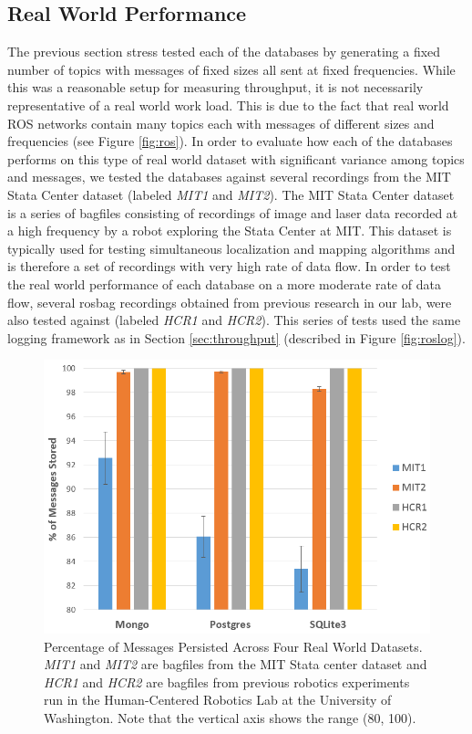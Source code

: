 \documentclass[nocopyrightspace]{acm_proc_article-sp}
\begin{document}
\subsection{Real World Performance}
\label{sec:realworld}
The previous section stress tested each of the databases by generating a fixed number of topics with messages of fixed sizes all sent at fixed frequencies. While this was a reasonable setup for measuring throughput, it is not necessarily representative of a real world work load. This is due to the fact that real world ROS networks contain many topics each with messages of different sizes and frequencies (see Figure \ref{fig:ros}). In order to evaluate how each of the databases performs on this type of real world dataset with significant variance among topics and messages, we tested the databases against several recordings from the MIT Stata Center dataset (labeled \textit{MIT1} and \textit{MIT2}). The MIT Stata Center dataset is a series of bagfiles consisting of recordings of image and laser data recorded at a high frequency by a robot exploring the Stata Center at MIT. This dataset is typically used for testing simultaneous localization and mapping algorithms and is therefore a set of recordings with very high rate of data flow. In order to test the real world performance of each database on a more moderate rate of data flow, several rosbag recordings obtained from previous research in our lab, were also tested against (labeled \textit{HCR1} and \textit{HCR2}). This series of tests used the same logging framework as in Section \ref{sec:throughput} (described in Figure \ref{fig:roslog}).

\begin{figure}
    \centering
    \includegraphics[width=\linewidth]{images/realworld}
    \caption{Percentage of Messages Persisted Across Four Real World Datasets. \textit{MIT1} and \textit{MIT2} are bagfiles from the MIT Stata center dataset and \textit{HCR1} and \textit{HCR2} are bagfiles from previous robotics experiments run in the Human-Centered Robotics Lab at the University of Washington. Note that the vertical axis shows the range (80, 100).}
    \label{fig:realworld}
\end{figure}
\end{document}
